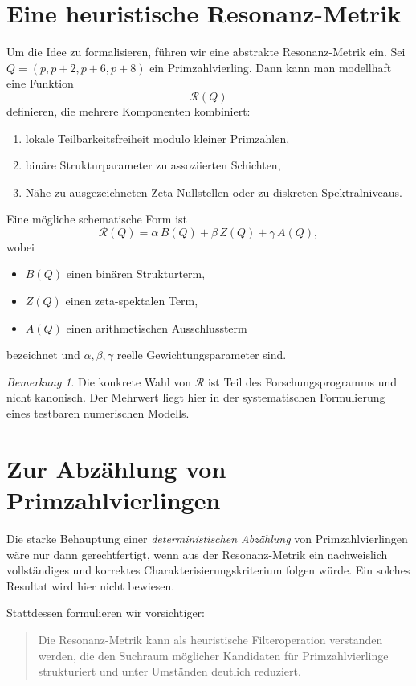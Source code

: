 \documentclass[11pt,a4paper,twocolumn]{article}
\theoremstyle{definition}
\theoremstyle{remark}
\newtheorem{bemerkung}{Bemerkung}
\begin{document}
	\section{Eine heuristische Resonanz-Metrik}
	Um die Idee zu formalisieren, führen wir eine abstrakte Resonanz-Metrik ein. Sei $Q=(p,p+2,p+6,p+8)$ ein Primzahlvierling. Dann kann man modellhaft eine Funktion
	\[
	\mathcal{R}(Q)
	\]
	definieren, die mehrere Komponenten kombiniert:
	\begin{enumerate}
		\item lokale Teilbarkeitsfreiheit modulo kleiner Primzahlen,
		\item binäre Strukturparameter zu assoziierten Schichten,
		\item Nähe zu ausgezeichneten Zeta-Nullstellen oder zu diskreten Spektralniveaus.
	\end{enumerate}
	
	Eine mögliche schematische Form ist
	\begin{equation}
		\mathcal{R}(Q)=
		\alpha\,B(Q)+\beta\,Z(Q)+\gamma\,A(Q),
	\end{equation}
	wobei
	\begin{itemize}
		\item $B(Q)$ einen binären Strukturterm,
		\item $Z(Q)$ einen zeta-spektalen Term,
		\item $A(Q)$ einen arithmetischen Ausschlussterm
	\end{itemize}
	bezeichnet und $\alpha,\beta,\gamma$ reelle Gewichtungsparameter sind.
	
	\begin{bemerkung}
		Die konkrete Wahl von $\mathcal{R}$ ist Teil des Forschungsprogramms und nicht kanonisch. Der Mehrwert liegt hier in der systematischen Formulierung eines testbaren numerischen Modells.
	\end{bemerkung}
	
	\section{Zur Abzählung von Primzahlvierlingen}
	Die starke Behauptung einer \emph{deterministischen Abzählung} von Primzahlvierlingen wäre nur dann gerechtfertigt, wenn aus der Resonanz-Metrik ein nachweislich vollständiges und korrektes Charakterisierungskriterium folgen würde. Ein solches Resultat wird hier nicht bewiesen.
	
	Stattdessen formulieren wir vorsichtiger:
	
	\begin{quote}
		Die Resonanz-Metrik kann als heuristische Filteroperation verstanden werden, die den Suchraum möglicher Kandidaten für Primzahlvierlinge strukturiert und unter Umständen deutlich reduziert.
	\end{quote}
	
\end{document}
